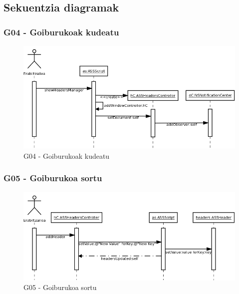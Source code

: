 \newpage
\subsection{Sekuentzia diagramak}

\subsubsection{G04 - Goiburukoak kudeatu}
\begin{figure}[htp]
\begin{center}
\includegraphics[scale=0.35]{Pictures/Chapter4/Diseinua/G04.png}
\caption{G04 - Goiburukoak kudeatu}
\label{g04d}
\end{center}
\end{figure}

\subsubsection{G05 - Goiburukoa sortu}
\begin{figure}[htp]
\begin{center}
\includegraphics[scale=0.35]{Pictures/Chapter4/Diseinua/G05.png}
\caption{G05 - Goiburukoa sortu}
\label{g05d}
\end{center}
\end{figure}

\newpage
